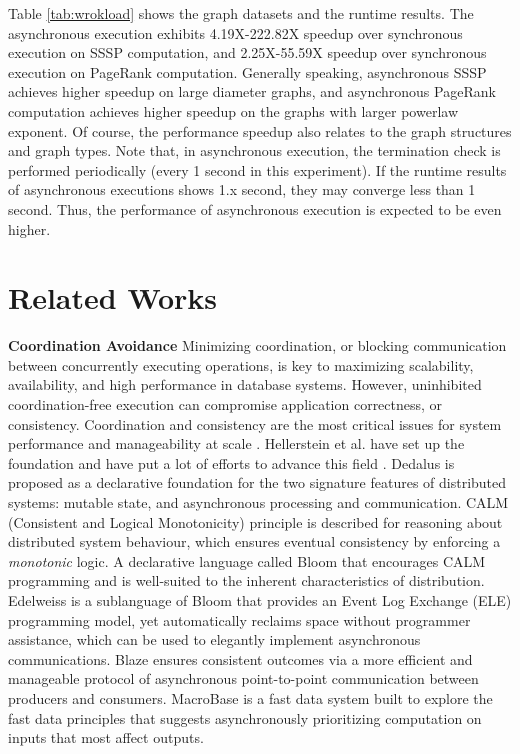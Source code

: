\documentclass{vldb}
\begin{document}
Table \ref{tab:wrokload} shows the graph datasets and the runtime results. The asynchronous execution exhibits 4.19X-222.82X speedup over synchronous execution on SSSP computation, and 2.25X-55.59X speedup over synchronous execution on PageRank computation. Generally speaking, asynchronous SSSP achieves higher speedup on large diameter graphs, and asynchronous PageRank computation achieves higher speedup on the graphs with larger powerlaw exponent. Of course, the performance speedup also relates to the graph structures and graph types. Note that, in asynchronous execution, the termination check is performed periodically (every 1 second in this experiment). If the runtime results of asynchronous executions shows 1.x second, they may converge less than 1 second. Thus, the performance of asynchronous execution is expected to be even higher.

\section{Related Works}
\label{sec:related}

\noindent\textbf{Coordination Avoidance} Minimizing coordination, or blocking communication between concurrently executing operations, is key to maximizing scalability, availability, and high performance in database systems. However, uninhibited coordination-free execution can compromise application correctness, or consistency. Coordination and consistency are the most critical issues for system performance and manageability at scale \cite{Bailis:2014:CAD:2735508.2735509}. Hellerstein et al. have set up the foundation \cite{Hellerstein:2010:DIE:1860702.1860704} and have put a lot of efforts to advance this field \cite{Alvaro:2013:CWB:2523616.2523632,Bailis:2014:QEC:2632661.2632792}. Dedalus \cite{Alvaro:2010:DDT:2185923.2185942} is proposed as a declarative foundation for the two signature features of distributed systems: mutable state, and asynchronous processing and communication. CALM (Consistent and Logical Monotonicity) principle \cite{calm} is described for reasoning about distributed system behaviour, which ensures eventual consistency by enforcing a \emph{monotonic} logic. A declarative language called Bloom \cite{Conway:2012:LLD:2391229.2391230} that encourages CALM programming and is well-suited to the inherent characteristics of distribution. Edelweiss \cite{Conway:2014:EAS:2732279.2732285} is a sublanguage of Bloom that provides an Event Log Exchange (ELE) programming model, yet automatically reclaims space without programmer assistance, which can be used to elegantly implement asynchronous communications. Blaze \cite{blaze} ensures consistent outcomes via a more efficient and manageable protocol of asynchronous point-to-point communication between producers and consumers. MacroBase \cite{Bailis:2017:MPA:3035918.3035928} is a fast data system built to explore the fast data principles that suggests asynchronously prioritizing computation on inputs that most affect outputs.
\end{document}
